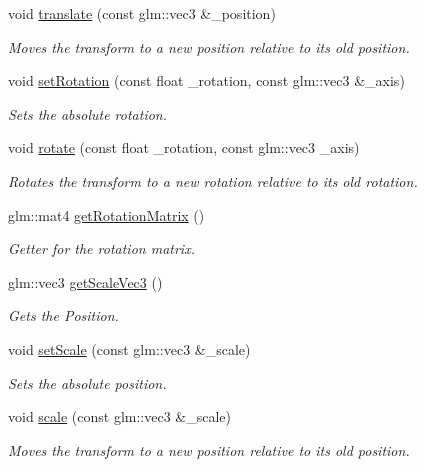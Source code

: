 \begin{DoxyCompactItemize}
void \hyperlink{class_cookie_eng_1_1_components_1_1_transform_afe2e00e8126fd92eab8c2e1a5725b2c5}{translate} (const glm\+::vec3 \&\+\_\+position)
\begin{DoxyCompactList}\small\item\em Moves the transform to a new position relative to its old position. \end{DoxyCompactList}\item 
void \hyperlink{class_cookie_eng_1_1_components_1_1_transform_a382a16d437c34d7e345a60d11a9578b2}{set\+Rotation} (const float \+\_\+rotation, const glm\+::vec3 \&\+\_\+axis)
\begin{DoxyCompactList}\small\item\em Sets the absolute rotation. \end{DoxyCompactList}\item 
void \hyperlink{class_cookie_eng_1_1_components_1_1_transform_a061b3b2b5d33c1dda2955e9b2e01d736}{rotate} (const float \+\_\+rotation, const glm\+::vec3 \+\_\+axis)
\begin{DoxyCompactList}\small\item\em Rotates the transform to a new rotation relative to its old rotation. \end{DoxyCompactList}\item 
glm\+::mat4 \hyperlink{class_cookie_eng_1_1_components_1_1_transform_a069b3948eab396b9f83fa9b983983e09}{get\+Rotation\+Matrix} ()
\begin{DoxyCompactList}\small\item\em Getter for the rotation matrix. \end{DoxyCompactList}\item 
glm\+::vec3 \hyperlink{class_cookie_eng_1_1_components_1_1_transform_a8ed85d55bd1084dde196ceb1b16fa736}{get\+Scale\+Vec3} ()
\begin{DoxyCompactList}\small\item\em Gets the Position. \end{DoxyCompactList}\item 
void \hyperlink{class_cookie_eng_1_1_components_1_1_transform_a6dadfac773418cc71d538c89219af0db}{set\+Scale} (const glm\+::vec3 \&\+\_\+scale)
\begin{DoxyCompactList}\small\item\em Sets the absolute position. \end{DoxyCompactList}\item 
void \hyperlink{class_cookie_eng_1_1_components_1_1_transform_abfb2568bd0222d8687593d253688f99f}{scale} (const glm\+::vec3 \&\+\_\+scale)
\begin{DoxyCompactList}\small\item\em Moves the transform to a new position relative to its old position. \end{DoxyCompactList}\end{DoxyCompactItemize}
